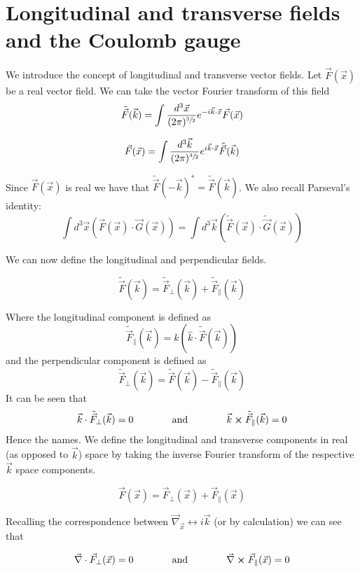 \documentclass[12pt]{article}
\newcommand{\pll}{\parallel}
\newcommand{\vecnab}{\vec{\nabla}}
\begin{document}
\section{Longitudinal and transverse fields and the Coulomb gauge}
We introduce the concept of longitudinal and transverse vector fields.
Let $\vec{F}(\vec{x})$ be a real vector field.
We can take the vector Fourier transform of this field
\[ \tilde{\vec{F}}(\vec{k}) = \int \frac{d^3\vec{x}}{(2\pi)^{\sfrac{3}{2}}} e^{-i \vec{k} \cdot \vec{x}} \vec{F}(\vec{x}) \]

\[ \vec{F}(\vec{x}) = \int \frac{d^3\vec{k}}{(2\pi)^{\sfrac{3}{2}}} e^{i \vec{k} \cdot \vec{x}} \tilde{\vec{F}}(\vec{k}) \]

Since $\vec{F}(\vec{x})$ is real we have that $\tilde{\vec{F}}(-\vec{k})^* = \tilde{\vec{F}}(\vec{k})$.
We also recall Parseval's identity:
\[\int d^3 \vec{x} \left(\vec{F}(\vec{x}) \cdot \vec{G}(\vec{x})\right) = \int d^3 \vec{k} \left(\tilde{\vec{F}}(\vec{x}) \cdot \tilde{\vec{G}}(\vec{x})\right) \]

We can now define the longitudinal and perpendicular fields.

\[ \tilde{\vec{F}}(\vec{k}) = \tilde{\vec{F}}_{\perp}(\vec{k}) + \tilde{\vec{F}}_{\pll}(\vec{k})\]

Where the longitudinal component is defined as
\[ \tilde{\vec{F}}_{\pll}(\vec{k}) = \hat{k}\left(\hat{k} \cdot \tilde{\vec{F}}(\vec{k})\right) \]
and the perpendicular component is defined as
\[ \tilde{\vec{F}}_{\perp}(\vec{k}) = \tilde{\vec{F}}(\vec{k}) - \tilde{\vec{F}}_{\pll}(\vec{k})\]
It can be seen that
\[ \vec{k} \cdot \tilde{\vec{F}}_{\perp}(\vec{k}) = 0 \hspace{.5 in}\text{ and } \hspace{.5 in} \vec{k} \cross \tilde{\vec{F}}_{\pll}(\vec{k}) = 0\]
Hence the names.
We define the longitudinal and transverse components in real (as opposed to $\vec{k}$) space by taking the inverse Fourier transform of the respective $\vec{k}$ space components.

\[\vec{F}(\vec{x}) = \vec{F}_{\perp}(\vec{x})+\vec{F}_{\pll}(\vec{x}) \]

Recalling the correspondence between $\vecnab_{\vec{x}} \leftrightarrow  i \vec{k}$ (or by calculation) we can see that

\[\vecnab \cdot \vec{F}_{\perp}(\vec{x}) =  0 \hspace{.5 in} \text{ and } \hspace{.5 in} \vecnab \cross \vec{F}_{\pll}(\vec{x})=0 \]
\end{document}

